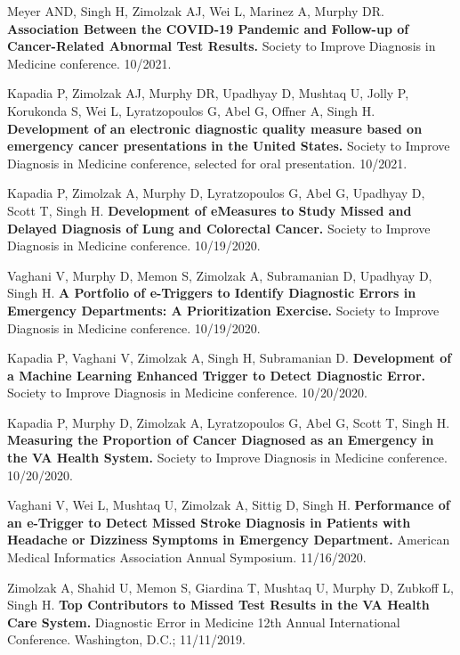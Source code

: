 \documentclass[10pt]{article}
\begin{document}
Meyer AND, Singh H, Zimolzak AJ, Wei L, Marinez A, Murphy DR.
\textbf{Association Between the COVID-19 Pandemic and Follow-up of
  Cancer-Related Abnormal Test Results.} Society to Improve Diagnosis
in Medicine conference. 10/2021.

Kapadia P, Zimolzak AJ, Murphy DR, Upadhyay D, Mushtaq U, Jolly P,
Korukonda S, Wei L, Lyratzopoulos G, Abel G, Offner A, Singh H.
\textbf{Development of an electronic diagnostic quality measure based
  on emergency cancer presentations in the United States.} Society to
Improve Diagnosis in Medicine conference, selected for oral
presentation. 10/2021.


Kapadia P, Zimolzak A, Murphy D, Lyratzopoulos G, Abel G, Upadhyay D,
Scott T, Singh H. \textbf{Development of eMeasures to Study Missed and
  Delayed Diagnosis of Lung and Colorectal Cancer.} Society to Improve
Diagnosis in Medicine conference. 10/19/2020.

Vaghani V, Murphy D, Memon S, Zimolzak A, Subramanian D, Upadhyay D,
Singh H. \textbf{A Portfolio of e-Triggers to Identify Diagnostic
  Errors in Emergency Departments: A Prioritization Exercise.} Society
to Improve Diagnosis in Medicine conference. 10/19/2020.

Kapadia P, Vaghani V, Zimolzak A, Singh H, Subramanian D.
\textbf{Development of a Machine Learning Enhanced Trigger to Detect
  Diagnostic Error.} Society to Improve Diagnosis in Medicine
conference. 10/20/2020.

Kapadia P, Murphy D, Zimolzak A, Lyratzopoulos G, Abel G, Scott T,
Singh H. \textbf{Measuring the Proportion of Cancer Diagnosed as an
  Emergency in the VA Health System.} Society to Improve Diagnosis in
Medicine conference. 10/20/2020.


Vaghani V, Wei L, Mushtaq U, Zimolzak A, Sittig D, Singh H.
\textbf{Performance of an e-Trigger to Detect Missed Stroke Diagnosis
  in Patients with Headache or Dizziness Symptoms in Emergency
  Department.} American Medical Informatics Association Annual
Symposium. 11/16/2020.


Zimolzak A, Shahid U, Memon S, Giardina T, Mushtaq U, Murphy D,
Zubkoff L, Singh H. \textbf{Top Contributors to Missed Test Results in
  the VA Health Care System.} Diagnostic Error in Medicine 12th Annual
International Conference. Washington, D.C.; 11/11/2019.
\end{document}
